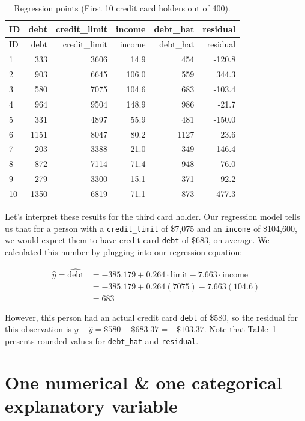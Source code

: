 \documentclass[
  letterpaper,
  DIV=11,
  numbers=noendperiod]{scrreprt}
\theoremstyle{definition}
\theoremstyle{remark}
\begin{document}
\hypertarget{tbl-model3-points-table}{}
\begin{longtable}[]{@{}lrrrrr@{}}
\caption{\label{tbl-model3-points-table}Regression points (First 10
credit card holders out of 400).}\tabularnewline
\toprule()
ID & debt & credit\_limit & income & debt\_hat & residual \\
\midrule()
\endfirsthead
\toprule()
ID & debt & credit\_limit & income & debt\_hat & residual \\
\midrule()
\endhead
1 & 333 & 3606 & 14.9 & 454 & -120.8 \\
2 & 903 & 6645 & 106.0 & 559 & 344.3 \\
3 & 580 & 7075 & 104.6 & 683 & -103.4 \\
4 & 964 & 9504 & 148.9 & 986 & -21.7 \\
5 & 331 & 4897 & 55.9 & 481 & -150.0 \\
6 & 1151 & 8047 & 80.2 & 1127 & 23.6 \\
7 & 203 & 3388 & 21.0 & 349 & -146.4 \\
8 & 872 & 7114 & 71.4 & 948 & -76.0 \\
9 & 279 & 3300 & 15.1 & 371 & -92.2 \\
10 & 1350 & 6819 & 71.1 & 873 & 477.3 \\
\bottomrule()
\end{longtable}

Let's interpret these results for the third card holder. Our regression
model tells us that for a person with a \texttt{credit\_limit} of
\$7,075 and an \texttt{income} of \$104,600, we would expect them to
have credit card \texttt{debt} of \$683, on average. We calculated this
number by plugging into our regression equation:

\[
\begin{aligned}
\widehat{y} = \widehat{\text{debt}} &= -385.179 + 0.264 \cdot \text{limit} - 7.663 \cdot \text{income} \\
&= -385.179 + 0.264(7075) - 7.663(104.6) \\
&= 683
\end{aligned}
\]

However, this person had an actual credit card \texttt{debt} of \$580,
so the residual for this observation is
\(y - \widehat{y} = \$580 - \$683.37 = -\$103.37\). Note that
Table~\ref{tbl-model3-points-table} presents rounded values for
\texttt{debt\_hat} and \texttt{residual}.

\hypertarget{sec-model4}{%
\section{One numerical \& one categorical explanatory
variable}\label{sec-model4}}
\end{document}
